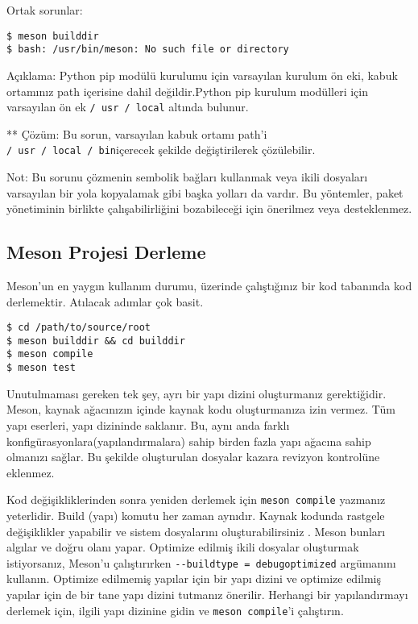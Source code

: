 \documentclass[
]{book}
\begin{document}
Ortak sorunlar:

\begin{verbatim}
$ meson builddir
$ bash: /usr/bin/meson: No such file or directory
\end{verbatim}

Açıklama: Python pip modülü kurulumu için varsayılan kurulum ön eki, kabuk ortamınız path içerisine dahil değildir.Python pip kurulum modülleri için varsayılan ön ek \texttt{/\ usr\ /\ local} altında bulunur.

** Çözüm: Bu sorun, varsayılan kabuk ortamı path'i \texttt{/\ usr\ /\ local\ /\ bin}içerecek şekilde değiştirilerek çözülebilir.

Not: Bu sorunu çözmenin sembolik bağları kullanmak veya ikili dosyaları varsayılan bir yola kopyalamak gibi başka yolları da vardır. Bu yöntemler, paket yönetiminin birlikte çalışabilirliğini bozabileceği için önerilmez veya desteklenmez.

\hypertarget{meson-projesi-derleme}{%
\subsection{Meson Projesi Derleme}\label{meson-projesi-derleme}}

Meson'un en yaygın kullanım durumu, üzerinde çalıştığınız bir kod tabanında kod derlemektir. Atılacak adımlar çok basit.

\begin{verbatim}
$ cd /path/to/source/root
$ meson builddir && cd builddir
$ meson compile
$ meson test
\end{verbatim}

Unutulmaması gereken tek şey, ayrı bir yapı dizini oluşturmanız gerektiğidir. Meson, kaynak ağacınızın içinde kaynak kodu oluşturmanıza izin vermez. Tüm yapı eserleri, yapı dizininde saklanır. Bu, aynı anda farklı konfigürasyonlara(yapılandırmalara) sahip birden fazla yapı ağacına sahip olmanızı sağlar. Bu şekilde oluşturulan dosyalar kazara revizyon kontrolüne eklenmez.

Kod değişikliklerinden sonra yeniden derlemek için \texttt{meson\ compile} yazmanız yeterlidir. Build (yapı) komutu her zaman aynıdır. Kaynak kodunda rastgele değişiklikler yapabilir ve sistem dosyalarını oluşturabilirsiniz . Meson bunları algılar ve doğru olanı yapar. Optimize edilmiş ikili dosyalar oluşturmak istiyorsanız, Meson'u çalıştırırken \texttt{-\/-buildtype\ =\ debugoptimized} argümanını kullanın. Optimize edilmemiş yapılar için bir yapı dizini ve optimize edilmiş yapılar için de bir tane yapı dizini tutmanız önerilir. Herhangi bir yapılandırmayı derlemek için, ilgili yapı dizinine gidin ve \texttt{meson\ compile}'i çalıştırın.
\end{document}
